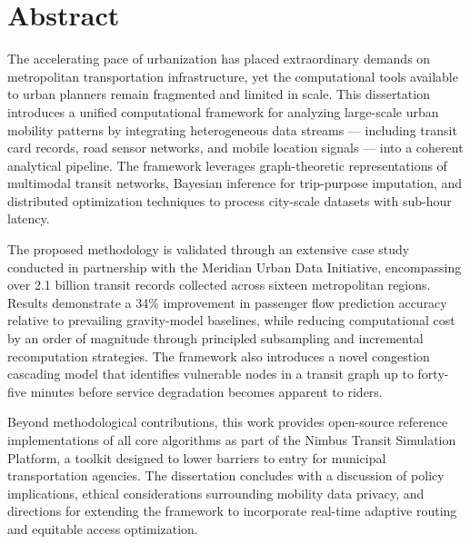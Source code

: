 \chapter*{Abstract}
\thispagestyle{plain}

\begin{abstractbox}
\singlespacing
The accelerating pace of urbanization has placed extraordinary demands on metropolitan transportation infrastructure, yet the computational tools available to urban planners remain fragmented and limited in scale. This dissertation introduces a unified computational framework for analyzing large-scale urban mobility patterns by integrating heterogeneous data streams --- including transit card records, road sensor networks, and mobile location signals --- into a coherent analytical pipeline. The framework leverages graph-theoretic representations of multimodal transit networks, Bayesian inference for trip-purpose imputation, and distributed optimization techniques to process city-scale datasets with sub-hour latency.

The proposed methodology is validated through an extensive case study conducted in partnership with the Meridian Urban Data Initiative, encompassing over 2.1 billion transit records collected across sixteen metropolitan regions. Results demonstrate a 34\% improvement in passenger flow prediction accuracy relative to prevailing gravity-model baselines, while reducing computational cost by an order of magnitude through principled subsampling and incremental recomputation strategies. The framework also introduces a novel congestion cascading model that identifies vulnerable nodes in a transit graph up to forty-five minutes before service degradation becomes apparent to riders.

Beyond methodological contributions, this work provides open-source reference implementations of all core algorithms as part of the Nimbus Transit Simulation Platform, a toolkit designed to lower barriers to entry for municipal transportation agencies. The dissertation concludes with a discussion of policy implications, ethical considerations surrounding mobility data privacy, and directions for extending the framework to incorporate real-time adaptive routing and equitable access optimization.
\end{abstractbox}
